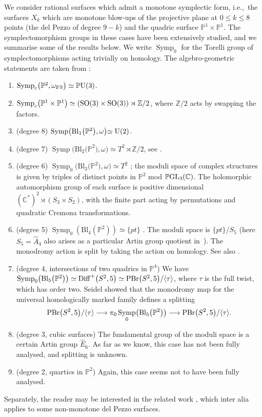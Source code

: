 \documentclass[pdftex]{sigma}
\newcommand{\FS}{\mathrm{FS}}
\newcommand{\Bl}{\mathrm{Bl}}
\DeclareMathOperator{\Diff}{Diff}
\DeclareMathOperator{\Symp}{Symp}
\def\bP{\mathbb{P}}
\def\bZ{\mathbb{Z}}
\def\bC{\mathbb{C}}
\theoremstyle{definition}
\numberwithin{equation}{section}
\begin{document}
We consider rational surfaces which admit a monotone symplectic form, i.e.,~the surfaces $X_k$ which are monotone blow-ups of the projective plane at $0 \leq k \leq 8$ points (the del Pezzo of degree $9-k$) and the quadric surface $\bP^1 \times \bP^1$. The symplectomorphism groups in these cases have been extensively studied, and we summarise some of the results below. We write $\Symp_0$ for the Torelli group of symplectomorphisms acting trivially on homology. The algebro-geometric statements are taken from \cite{Dolgachev-book, Looijenga, Okada-Spotti-Sun}:
\begin{enumerate}\itemsep=0pt
 \item $\Symp_c\bigl(\bP^2, \omega_\FS\bigr) \simeq \bP {\rm U}(3)$.
 \item $\Symp_c\bigl(\bP^1\times \bP^1\bigr) \simeq ({\rm SO}(3)\times {\rm SO}(3)) \rtimes \bZ/2$, where $\bZ/2$ acts by swapping the factors.
 \item (degree 8) $\Symp \bigl(\Bl_1\bigl(\bP^2\bigr), \omega\bigl) \simeq {\rm U}(2)$.
 \item (degree 7) $\Symp\bigl(\Bl_2\bigl(\bP^2\bigr), \omega\bigr) \simeq T^2 \rtimes \bZ/2$, see \cite{Lalonde-Pinsonnault, Pinsonnault}.
 \item (degree 6) $\Symp_0\bigl(\Bl_3\bigl(\bP^2\bigr),\omega\bigr) \simeq T^2$ \cite{Evans}; the moduli space of complex structures is given by triples of distinct points in $\bP^2$ mod $\bP {\rm GL}_3(\bC)$.
 The holomorphic automorphism group of each surface is positive dimensional $(\bC^*)^2 \rtimes (S_3 \times S_2)$, with the finite part acting by permutations and quadratic Cremona transformations.
 \item (degree 5) $\Symp_0(\Bl_4(\bP^2)) \simeq \{pt\}$ \cite{Evans}. The moduli space is $\{pt\} / S_5$ (here $S_5 = \hat{A}_4$ also arises as a particular Artin group quotient in~\cite{Looijenga}). The monodromy action is split by taking the action on homology. See also
 \cite{Evans, Li-Li-Wu-1, Li-Li-Wu-2, Li-Wu}.
 \item (degree 4, intersections of two quadrics in $\bP^4$) We have $\Symp_0\bigl(\Bl_5\bigl(\bP^2\bigr)\bigr) \simeq \Diff^+\bigl(S^2,5\bigr) \simeq {\rm PBr}\bigl(S^2,5\bigr)/\langle \tau \rangle$, where $\tau$ is the full twist, which has order two. Seidel \cite{Seidel_lectures_4Dtwists} showed that the monodromy map for the universal homologically marked family defines a splitting
 \[
 {\rm PBr}\bigl(S^2,5\bigr)/\langle \tau \rangle \longrightarrow \pi_0\Symp_0\bigl(\Bl_5\bigl(\bP^2\bigr)\bigr) \longrightarrow {\rm PBr}\bigl(S^2,5\bigr)/\langle \tau \rangle.
 \]
 \item (degree 3, cubic surfaces) The fundamental group of the moduli space is a certain Artin group $\hat{E}_6$. As far as we know, this case has not been fully analysed, and splitting is unknown.

 \item (degree 2, quartics in $\bP^2$) Again, this case seems not to have been fully analysed.
\end{enumerate}
Separately, the reader may be interested in the related work \cite{Li-Li-Wu}, which inter alia applies to some non-monotone del Pezzo surfaces.
\end{document}
